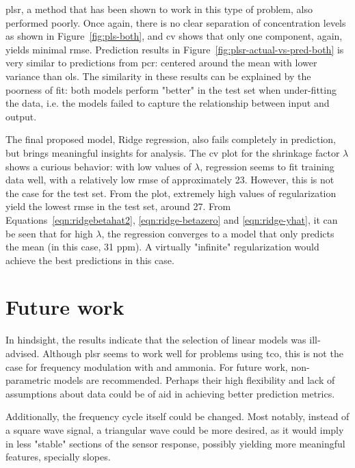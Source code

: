 \acrshort{plsr}, a method that has been shown to work in this type of problem, also performed poorly. Once again, there is no clear separation of concentration levels as shown in Figure~\ref{fig:pls-both}, and \acrshort{cv} shows that only one component, again, yields minimal \acrshort{rmse}. Prediction results in Figure~\ref{fig:plsr-actual-vs-pred-both} is very similar to predictions from \acrshort{pcr}: centered around the mean with lower variance than \acrshort{ols}. The similarity in these results can be explained by the poorness of fit: both models perform "better" in the test set when under-fitting the data, i.e. the models failed to capture the relationship between input and output.

The final proposed model, Ridge regression, also fails completely in prediction, but brings meaningful insights for analysis. The \acrshort{cv} plot for the shrinkage factor $\lambda$ shows a curious behavior: with low values of $\lambda$, regression seems to fit training data well, with a relatively low \acrshort{rmse} of approximately 23. However, this is not the case for the test set. From the plot, extremely high values of regularization yield the lowest \acrshort{rmse} in the test set, around 27. From Equations~\ref{eqn:ridgebetahat2}, \ref{eqn:ridge-betazero} and \ref{eqn:ridge-yhat}, it can be seen that for high $\lambda$, the regression converges to a model that only predicts the mean (in this case, 31 ppm). A virtually "infinite" regularization would achieve the best predictions in this case.

\section{Future work}
\label{sec:discussion-method}

In hindsight, the results indicate that the selection of linear models was ill-advised. Although \acrshort{plsr} seems to work well for problems using \acrshort{tco}, this is not the case for frequency modulation with \nox and ammonia. For future work, non-parametric models are recommended. Perhaps their high flexibility and  lack of assumptions about data could be of aid in achieving better prediction metrics.

Additionally, the frequency cycle itself could be changed. Most notably, instead of a square wave signal, a triangular wave could be more desired, as it would imply in less "stable" sections of the sensor response, possibly yielding more meaningful features, specially slopes.

